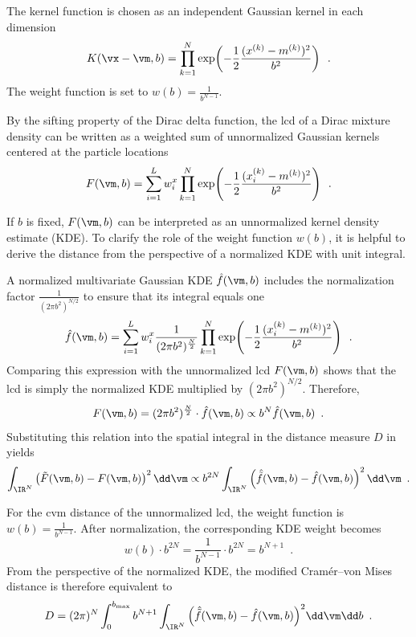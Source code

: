 The kernel function is chosen as an independent Gaussian kernel in each dimension
\begin{equation}
	K(\vx - \vm, b) = \prod_{k=1}^N \exp\!\left(-\frac{1}{2}\frac{(x^{(k)} - m^{(k)})^2}{b^2}\right) \enspace.
\end{equation}
The weight function is set to $w(b) = \frac{1}{b^{N-1}}$.

By the sifting property of the Dirac delta function, the \ac{lcd} of a Dirac mixture density can be written as a weighted sum of unnormalized Gaussian kernels centered at the particle locations \cite{OPTREDUC}
\begin{equation}
	F(\vm, b) = \sum_{i=1}^L w_i^x \prod_{k=1}^N \exp\!\left(-\frac{1}{2}\frac{(x_i^{(k)} - m^{(k)})^2}{b^2}\right) \enspace.
\end{equation}

If $b$ is fixed, $F(\vm, b)$ can be interpreted as an unnormalized kernel density estimate (KDE). To clarify the role of the weight function $w(b)$, it is helpful to derive the distance from the perspective of a normalized KDE with unit integral.

A normalized multivariate Gaussian KDE $\hat{f}(\vm, b)$ includes the normalization factor $\frac{1}{(2\pi b^2)^{N/2}}$ to ensure that its integral equals one
\begin{equation}
	\hat{f}(\vm, b) = \sum_{i=1}^L w_i^x \frac{1}{(2\pi b^2)^{\frac{N}{2}}} \prod_{k=1}^N \exp\!\left(-\frac{1}{2}\frac{(x_i^{(k)} - m^{(k)})^2}{b^2}\right) \enspace.
\end{equation}
Comparing this expression with the unnormalized \ac{lcd} $F(\vm, b)$ shows that the \ac{lcd} is simply the normalized KDE multiplied by $(2\pi b^2)^{N/2}$. Therefore,
\begin{equation}
	F(\vm, b) = (2\pi b^2)^{\frac{N}{2}} \cdot \hat{f}(\vm, b) \propto b^N \hat{f}(\vm, b) \enspace.
\end{equation}
Substituting this relation into the spatial integral in the distance measure $D$ in  yields
\begin{equation}
	\int_{\IR^N} \left( \tilde{F}(\vm, b) - F(\vm, b) \right)^2 \dd\vm \propto b^{2N} \int_{\IR^N} \left( \hat{\tilde{f}}(\vm, b) - \hat{f}(\vm, b) \right)^2 \dd\vm \enspace.
\end{equation}

For the \ac{cvm} distance of the unnormalized \ac{lcd}, the weight function is $w(b) = \frac{1}{b^{N-1}}$. After normalization, the corresponding KDE weight becomes
\begin{equation}
	w(b) \cdot b^{2N} = \frac{1}{b^{N-1}} \cdot b^{2N} = b^{N+1} \enspace.
\end{equation}
From the perspective of the normalized KDE, the modified Cramér--von Mises distance is therefore equivalent to
\begin{equation}
	D = (2\pi)^N \int_0^{b_{\max}} b^{N+1} \int_{\IR^N} \Big( \hat{\tilde{f}}(\vm, b) - \hat{f}(\vm, b) \Big)^2 \dd\vm \dd b \enspace.
\end{equation}

